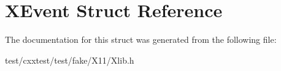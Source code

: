 \hypertarget{structXEvent}{\section{X\-Event Struct Reference}
\label{structXEvent}
}


The documentation for this struct was generated from the following file\-:\begin{DoxyCompactItemize}
\item 
test/cxxtest/test/fake/\-X11/Xlib.\-h\end{DoxyCompactItemize}
